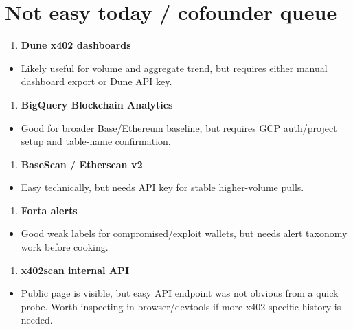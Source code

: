 \documentclass[11pt]{article}
\begin{document}
\section{Not easy today / cofounder queue}
\begin{enumerate}
  \item \textbf{Dune x402 dashboards}
\end{enumerate}
\begin{itemize}
  \item Likely useful for volume and aggregate trend, but requires either manual dashboard export or Dune API key.
\end{itemize}
\begin{enumerate}
  \item \textbf{BigQuery Blockchain Analytics}
\end{enumerate}
\begin{itemize}
  \item Good for broader Base/Ethereum baseline, but requires GCP auth/project setup and table-name confirmation.
\end{itemize}
\begin{enumerate}
  \item \textbf{BaseScan / Etherscan v2}
\end{enumerate}
\begin{itemize}
  \item Easy technically, but needs API key for stable higher-volume pulls.
\end{itemize}
\begin{enumerate}
  \item \textbf{Forta alerts}
\end{enumerate}
\begin{itemize}
  \item Good weak labels for compromised/exploit wallets, but needs alert taxonomy work before cooking.
\end{itemize}
\begin{enumerate}
  \item \textbf{x402scan internal API}
\end{enumerate}
\begin{itemize}
  \item Public page is visible, but easy API endpoint was not obvious from a quick probe. Worth inspecting in browser/devtools if more x402-specific history is needed.
\end{itemize}
\end{document}

